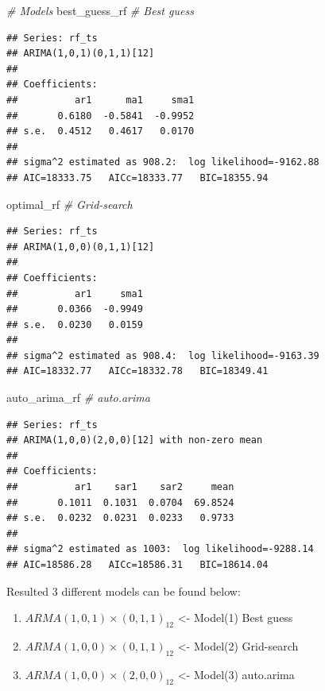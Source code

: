 \documentclass[
  11pt,
]{article}
\newenvironment{Shaded}{\begin{snugshade}}{\end{snugshade}}
\newcommand{\CommentTok}[1]{\textcolor[rgb]{0.56,0.35,0.01}{\textit{#1}}}
\newcommand{\NormalTok}[1]{#1}
\providecommand{\tightlist}{%
  \setlength{\itemsep}{0pt}\setlength{\parskip}{0pt}}
\begin{document}
\begin{Shaded}
\begin{Highlighting}[]
\CommentTok{# Models}
\NormalTok{best_guess_rf }\CommentTok{# Best guess}
\end{Highlighting}
\end{Shaded}

\begin{verbatim}
## Series: rf_ts 
## ARIMA(1,0,1)(0,1,1)[12] 
## 
## Coefficients:
##          ar1      ma1     sma1
##       0.6180  -0.5841  -0.9952
## s.e.  0.4512   0.4617   0.0170
## 
## sigma^2 estimated as 908.2:  log likelihood=-9162.88
## AIC=18333.75   AICc=18333.77   BIC=18355.94
\end{verbatim}

\begin{Shaded}
\begin{Highlighting}[]
\NormalTok{optimal_rf }\CommentTok{# Grid-search}
\end{Highlighting}
\end{Shaded}

\begin{verbatim}
## Series: rf_ts 
## ARIMA(1,0,0)(0,1,1)[12] 
## 
## Coefficients:
##          ar1     sma1
##       0.0366  -0.9949
## s.e.  0.0230   0.0159
## 
## sigma^2 estimated as 908.4:  log likelihood=-9163.39
## AIC=18332.77   AICc=18332.78   BIC=18349.41
\end{verbatim}

\begin{Shaded}
\begin{Highlighting}[]
\NormalTok{auto_arima_rf }\CommentTok{# auto.arima}
\end{Highlighting}
\end{Shaded}

\begin{verbatim}
## Series: rf_ts 
## ARIMA(1,0,0)(2,0,0)[12] with non-zero mean 
## 
## Coefficients:
##          ar1    sar1    sar2     mean
##       0.1011  0.1031  0.0704  69.8524
## s.e.  0.0232  0.0231  0.0233   0.9733
## 
## sigma^2 estimated as 1003:  log likelihood=-9288.14
## AIC=18586.28   AICc=18586.31   BIC=18614.04
\end{verbatim}

Resulted 3 different models can be found below:

\begin{enumerate}
\def\labelenumi{\arabic{enumi}.}
\tightlist
\item
  \(ARMA(1,0,1)\times(0,1,1)_{12}\) \textless- Model(1) Best guess
\item
  \(ARMA(1,0,0)\times(0,1,1)_{12}\) \textless- Model(2) Grid-search
\item
  \(ARMA(1,0,0)\times(2,0,0)_{12}\) \textless- Model(3) auto.arima
\end{enumerate}
\end{document}
